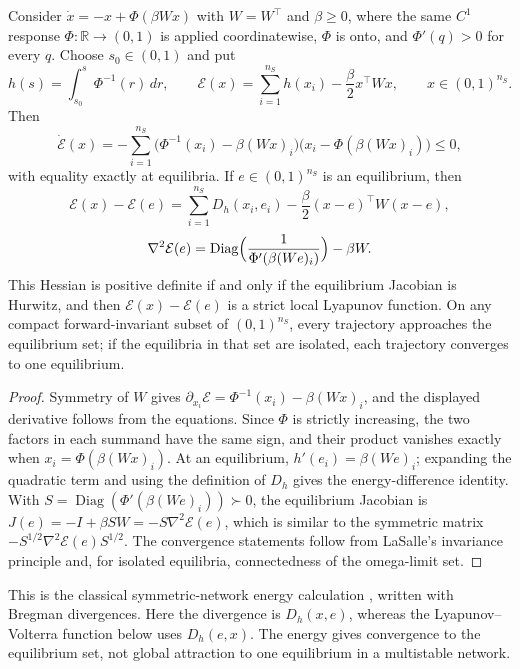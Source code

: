 Consider $\dot x=-x+\Phi(\beta Wx)$ with $W=W^\top$ and $\beta\ge0$, where the same $C^1$ response
$\Phi:\mathbb R\to(0,1)$ is applied coordinatewise, $\Phi$ is onto, and $\Phi'(q)>0$ for every $q$. Choose
$s_0\in(0,1)$ and put
\[
 h(s)=\int_{s_0}^{s}\Phi^{-1}(r)\,dr,\qquad
 \mathcal E(x)=\sum_{i=1}^{n_S}h(x_i)-\frac{\beta}{2}x^\top Wx,\qquad x\in(0,1)^{n_S}.
\]
Then
\[
 \dot{\mathcal E}(x)=-\sum_{i=1}^{n_S}\bigl(\Phi^{-1}(x_i)-\beta(Wx)_i\bigr)\bigl(x_i-\Phi(\beta(Wx)_i)\bigr)\le0,
\]
with equality exactly at equilibria. If $e\in(0,1)^{n_S}$ is an equilibrium, then
\[
 \mathcal E(x)-\mathcal E(e)=\sum_{i=1}^{n_S}D_h(x_i,e_i)-\frac{\beta}{2}(x-e)^\top W(x-e),
\]
\[
 \nabla^2\mathcal E(e)=\operatorname{Diag}\Bigl(\frac{1}{\Phi'(\beta(We)_i)}\Bigr)-\beta W.
\]
This Hessian is positive definite if and only if the equilibrium Jacobian is Hurwitz, and then
$\mathcal E(x)-\mathcal E(e)$ is a strict local Lyapunov function. On any compact forward-invariant
subset of $(0,1)^{n_S}$, every trajectory approaches the equilibrium set; if the equilibria in that
set are isolated, each trajectory converges to one equilibrium.
\eeP
\begin{proof}
Symmetry of $W$ gives $\partial_{x_i}\mathcal E=\Phi^{-1}(x_i)-\beta(Wx)_i$, and the displayed derivative
follows from the equations. Since $\Phi$ is strictly increasing, the two factors in each summand have the
same sign, and their product vanishes exactly when $x_i=\Phi(\beta(Wx)_i)$. At an equilibrium,
$h'(e_i)=\beta(We)_i$; expanding the quadratic term and using the definition of $D_h$ gives the
energy-difference identity. With $S=\operatorname{Diag}(\Phi'(\beta(We)_i))\succ0$, the equilibrium
Jacobian is $J(e)=-I+\beta SW=-S\nabla^2\mathcal E(e)$, which is similar to the symmetric matrix
$-S^{1/2}\nabla^2\mathcal E(e)S^{1/2}$. The convergence statements follow from LaSalle's invariance
principle and, for isolated equilibria, connectedness of the omega-limit set.
\end{proof}

This is the classical symmetric-network energy calculation \cite{Hopfield1984,Betteti2025}, written
with Bregman divergences. Here the divergence is $D_h(x,e)$, whereas the Lyapunov--Volterra function
below uses $D_h(e,x)$. The energy gives convergence to the equilibrium set, not global attraction to
one equilibrium in a multistable network.


